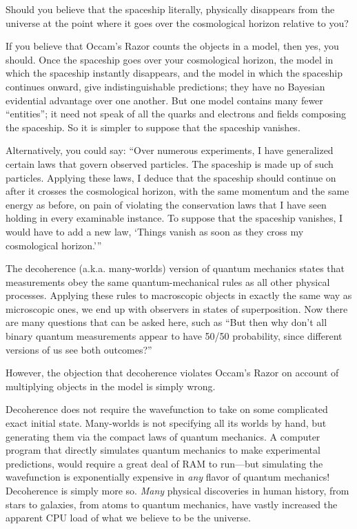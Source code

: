 {
 Should you believe that the spaceship literally, physically
disappears from the universe at the point where it goes over the
cosmological horizon relative to you?}

{
 If you believe that Occam's Razor counts the
objects in a model, then yes, you should. Once the spaceship goes over
your cosmological horizon, the model in which the spaceship instantly
disappears, and the model in which the spaceship continues onward, give
indistinguishable predictions; they have no Bayesian evidential
advantage over one another. But one model contains many fewer
``entities''; it need not speak of
all the quarks and electrons and fields composing the spaceship. So it
is simpler to suppose that the spaceship vanishes.}

{
 Alternatively, you could say: ``Over numerous
experiments, I have generalized certain laws that govern observed
particles. The spaceship is made up of such particles. Applying these
laws, I deduce that the spaceship should continue on after it crosses
the cosmological horizon, with the same momentum and the same energy as
before, on pain of violating the conservation laws that I have seen
holding in every examinable instance. To suppose that the spaceship
vanishes, I would have to add a new law, `Things vanish
as soon as they cross my cosmological
horizon.'''}

{
 The decoherence (a.k.a. many-worlds) version of quantum mechanics
states that measurements obey the same quantum-mechanical rules as all
other physical processes. Applying these rules to macroscopic objects
in exactly the same way as microscopic ones, we end up with observers
in states of superposition. Now there are many questions that can be
asked here, such as ``But then why
don't all binary quantum measurements appear to have
50/50 probability, since different versions of us see both
outcomes?''}

{
 However, the objection that decoherence violates
Occam's Razor on account of multiplying objects in the
model is simply wrong.}

{
 Decoherence does not require the wavefunction to take on some
complicated exact initial state. Many-worlds is not specifying all its
worlds by hand, but generating them via the compact laws of quantum
mechanics. A computer program that directly simulates quantum mechanics
to make experimental predictions, would require a great deal of RAM to
run---but simulating the wavefunction is exponentially expensive in
\textit{any} flavor of quantum mechanics! Decoherence is simply more
so. \textit{Many} physical discoveries in human history, from stars to
galaxies, from atoms to quantum mechanics, have vastly increased the
apparent CPU load of what we believe to be the universe.}

